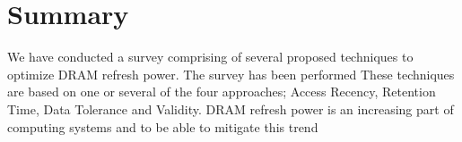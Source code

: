 \section{Summary} 
\label{sec:sum}
We have conducted a survey comprising of several proposed techniques to optimize DRAM refresh power. The survey has been performed  These techniques are based on one or several of the four approaches; Access Recency, Retention Time, Data Tolerance and Validity. DRAM refresh power is an increasing part of computing systems and to be able to mitigate this trend 
